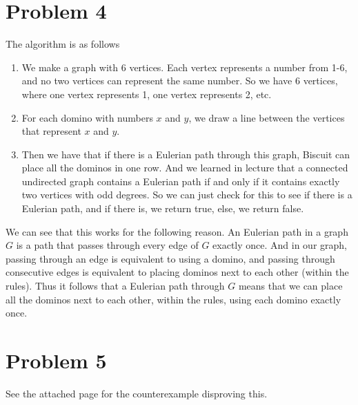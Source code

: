 \documentclass{article}
\begin{document}
\section*{Problem 4}
The algorithm is as follows
\begin{enumerate}
    \item We make a graph with 6 vertices. Each vertex represents a number
        from 1-6, and no two vertices can represent the same number. So we have
        6 vertices, where one vertex represents 1, one vertex represents 2,
        etc.
    \item For each domino with numbers $x$ and $y$, we draw a line between
        the vertices that represent $x$ and $y$.
    \item Then we have that if there is a Eulerian path through this graph,
        Biscuit can place all the dominos in one row. And we learned in lecture
        that a connected undirected graph contains a Eulerian path if and only
        if it contains exactly two vertices with odd degrees. So we can just
        check for this to see if there is a Eulerian path, and if there is,
        we return true, else, we return false.
\end{enumerate}
We can see that this works for the following reason. An Eulerian path in a
graph $G$ is a path that passes through every edge of $G$ exactly once.
And in our graph, passing through an edge is equivalent to using a domino,
and passing through consecutive edges is equivalent to placing dominos
next to each other (within the rules). Thus it follows that a Eulerian path
through $G$ means that we can place all the dominos next to each other, within
the rules, using each domino exactly once.
\section*{Problem 5}
See the attached page for the counterexample disproving this.
\end{document}
